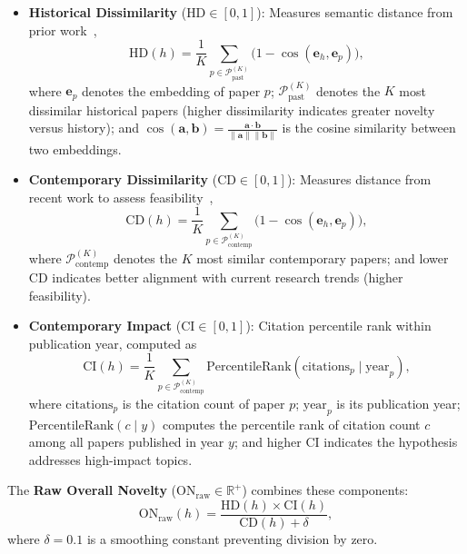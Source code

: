 \documentclass[runningheads]{llncs}
\begin{document}
\begin{itemize}[leftmargin=*, itemsep=2pt]
    \item \textbf{Historical Dissimilarity} ($\text{HD} \in [0, 1]$): Measures semantic distance from prior work~\cite{shao2020bertpli},
    \begin{equation}
        \text{HD}(h) = \frac{1}{K} \sum_{p \in \mathcal{P}_{\text{past}}^{(K)}} \big(1 - \cos(\mathbf{e}_h, \mathbf{e}_p)\big),
        \label{eq:hd}
    \end{equation}
    where $\mathbf{e}_p$ denotes the embedding of paper $p$; $\mathcal{P}_{\text{past}}^{(K)}$ denotes the $K$ most dissimilar historical papers (higher dissimilarity indicates greater novelty versus history); and $\cos(\mathbf{a}, \mathbf{b}) = \frac{\mathbf{a} \cdot \mathbf{b}}{\|\mathbf{a}\| \|\mathbf{b}\|}$ is the cosine similarity between two embeddings.
    
    \item \textbf{Contemporary Dissimilarity} ($\text{CD} \in [0, 1]$): Measures distance from recent work to assess feasibility~\cite{wu2019large,fortunato2018science},
    \begin{equation}
        \text{CD}(h) = \frac{1}{K} \sum_{p \in \mathcal{P}_{\text{contemp}}^{(K)}} \big(1 - \cos(\mathbf{e}_h, \mathbf{e}_p)\big),
        \label{eq:cd}
    \end{equation}
    where $\mathcal{P}_{\text{contemp}}^{(K)}$ denotes the $K$ most similar contemporary papers; and lower CD indicates better alignment with current research trends (higher feasibility).
    
    \item \textbf{Contemporary Impact} ($\text{CI} \in [0, 1]$): Citation percentile rank within publication year, computed as~\cite{yang2022gender,alshebli2018preeminence}
    \begin{equation}
        \text{CI}(h) = \frac{1}{K} \sum_{p \in \mathcal{P}_{\text{contemp}}^{(K)}} \text{PercentileRank}(\text{citations}_p \mid \text{year}_p),
        \label{eq:ci}
    \end{equation}
    where $\text{citations}_p$ is the citation count of paper $p$; $\text{year}_p$ is its publication year; $\text{PercentileRank}(c \mid y)$ computes the percentile rank of citation count $c$ among all papers published in year $y$; and higher CI indicates the hypothesis addresses high-impact topics.
\end{itemize}

The \textbf{Raw Overall Novelty} ($\text{ON}_{\text{raw}} \in \mathbb{R}^+$) combines these components:
\begin{equation}
   \text{ON}_{\text{raw}}(h) = \frac{\text{HD}(h) \times \text{CI}(h)}{\text{CD}(h) + \delta},
   \label{eq:on_raw}
\end{equation}
where $\delta = 0.1$ is a smoothing constant preventing division by zero.
\end{document}
